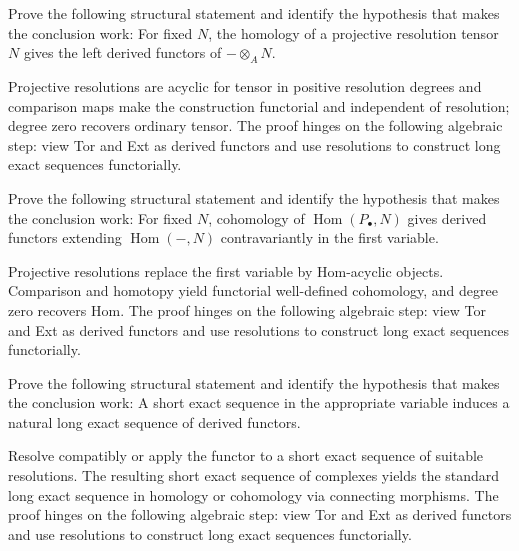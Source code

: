 \begin{problem}\label{prob:v28-problem-09}
Prove the following structural statement and identify the hypothesis that makes the conclusion work: For fixed $N$, the homology of a projective resolution tensor $N$ gives the left derived functors of $-\otimes_A N$.
\end{problem}
\begin{solution}
Projective resolutions are acyclic for tensor in positive resolution degrees and comparison maps make the construction functorial and independent of resolution; degree zero recovers ordinary tensor. The proof hinges on the following algebraic step: view Tor and Ext as derived functors and use resolutions to construct long exact sequences functorially.
\end{solution}

\begin{problem}\label{prob:v28-problem-10}
Prove the following structural statement and identify the hypothesis that makes the conclusion work: For fixed $N$, cohomology of $\operatorname{Hom}(P_\bullet,N)$ gives derived functors extending $\operatorname{Hom}(-,N)$ contravariantly in the first variable.
\end{problem}
\begin{solution}
Projective resolutions replace the first variable by Hom-acyclic objects. Comparison and homotopy yield functorial well-defined cohomology, and degree zero recovers Hom. The proof hinges on the following algebraic step: view Tor and Ext as derived functors and use resolutions to construct long exact sequences functorially.
\end{solution}

\begin{problem}\label{prob:v28-problem-11}
Prove the following structural statement and identify the hypothesis that makes the conclusion work: A short exact sequence in the appropriate variable induces a natural long exact sequence of derived functors.
\end{problem}
\begin{solution}
Resolve compatibly or apply the functor to a short exact sequence of suitable resolutions. The resulting short exact sequence of complexes yields the standard long exact sequence in homology or cohomology via connecting morphisms. The proof hinges on the following algebraic step: view Tor and Ext as derived functors and use resolutions to construct long exact sequences functorially.
\end{solution}

